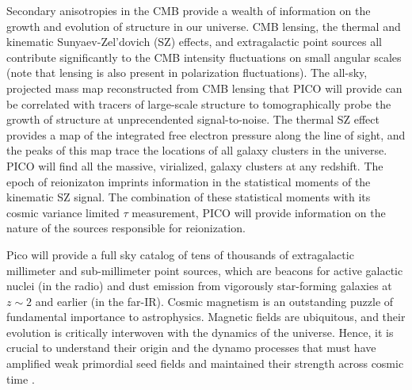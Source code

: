 \documentclass[PICOReport.tex]{subfiles}
\begin{document}
  Secondary anisotropies in the CMB provide
a wealth of information on the growth and evolution of structure in our universe.
CMB lensing, the thermal and kinematic Sunyaev-Zel'dovich (SZ)
effects, and extragalactic point sources all contribute significantly
to the CMB intensity fluctuations on small angular scales (note that
lensing is also present in polarization fluctuations). The all-sky,
projected mass map reconstructed from CMB lensing that PICO will
provide can be correlated with tracers of large-scale structure to
tomographically probe the growth of structure at unprecendented
signal-to-noise. The thermal SZ effect provides a map of the
integrated free electron pressure along the line of sight, and the
peaks of this map trace the locations of all galaxy clusters in the
universe. PICO will find all the massive, virialized, galaxy clusters
at any redshift.  The epoch of reionizaton imprints information in the
statistical moments of the kinematic SZ signal.  The combination of
these statistical moments with its cosmic variance limited $\tau$
measurement, PICO will provide information on the nature of the
sources responsible for reionization.

Pico will provide a full sky catalog of tens of thousands of
extragalactic millimeter and sub-millimeter point sources, which are
beacons for active galactic nuclei (in the radio) and dust emission
from vigorously star-forming galaxies at $z \sim 2$ and earlier (in
the far-IR).
Cosmic magnetism is an outstanding puzzle of fundamental importance to astrophysics. Magnetic fields are ubiquitous, and their evolution is critically interwoven with the dynamics of the universe. Hence, it is crucial to understand
their origin and the dynamo processes that must have amplified weak  primordial seed fields 
and maintained their strength across cosmic time \citep{Brandenburg2005}. 
\end{document}
